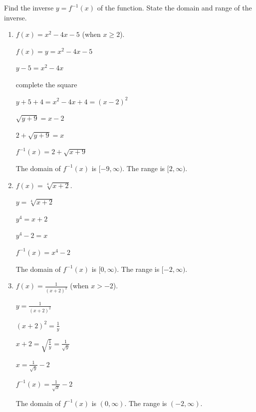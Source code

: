 \documentclass[handout,nooutcomes]{ximera}
\begin{document}
\begin{problem}			
				
Find the inverse $y=f^{-1}(x)$ of the function.  State the domain and range of the inverse.
	
			\begin{enumerate}
			\item  $f(x)=x^2-4x-5$ (when $x\geq2$).
			
			 \begin{freeResponse}			 
			 $f(x)= y =x^2-4x-5 $ 
			
			$y-5=x^2-4x $
			
			complete the square
			
			$y+5+4=x^2-4x+4 = (x-2)^2$
			
			$ \sqrt{y+9}=x-2$
			
			$2+\sqrt{y+9}=x$
			
			$f^{-1}(x) = 2 + \sqrt{x + 9}$
			
			The domain of $f^{-1}(x)$ is $[-9,\infty )$.  The range is $[2,\infty )$.
			 \end{freeResponse}
			 
			\item  $f(x)=\sqrt[4]{x+2}$.
			
			 \begin{freeResponse}			 
			 $y=\sqrt[4]{x+2}$
			
			$y^4 = x + 2$
			
			$y^4 - 2 = x$
			
			$f^{-1}(x) = x^4 - 2$
			
			The domain of $f^{-1}(x)$ is $[0, \infty )$.  The range is $[-2, \infty )$.  
			 \end{freeResponse}
			 
			\item  $f(x)=\frac{1}{(x+2)^2}$  (when $x>-2$).
			
			 \begin{freeResponse}			 
			 $y = \frac{1}{(x+2)^2}$
			
			$(x+2)^2 = \frac{1}{y}$
			
			$ x+2 = \sqrt{\frac{1}{y}} = \frac{1}{\sqrt{y}}$	
			
			$x = \frac{1}{\sqrt{y}} - 2 $
			
			$f^{-1}(x) = \frac{1}{\sqrt{x}} - 2$
			
			The domain of $f^{-1}(x)$ is $(0, \infty)$.  The range is $(-2, \infty )$. 
			 \end{freeResponse}
			 
			\end{enumerate}
			
\end{problem}
	
\end{document}
